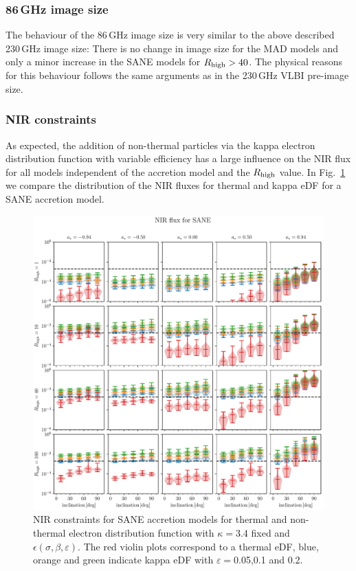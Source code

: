 \subsubsection{86\,GHz image size}
The behaviour of the 86\,GHz image size is very similar to the above described 230\,GHz image size: There is no change in image size for the MAD models and only a minor increase in the SANE models for $R_{\rm high}>40$. The physical reasons for this behaviour follows the same arguments as in the 230\,GHz VLBI pre-image size.

\subsubsection{NIR constraints}
As expected, the addition of non-thermal particles via the kappa electron distribution function with variable efficiency has a large influence on the NIR flux for all models independent of the accretion model and the $R_{\rm high}$ value. In Fig.~\ref{fig:NIR_kappaepsilon} we compare the distribution of the NIR fluxes for thermal and kappa eDF for a SANE accretion model.


\begin{figure}
  \centering
  \includegraphics[width=\columnwidth]{./figures/SANE_NIR_standard.pdf}
  \caption{NIR constraints for SANE accretion models for thermal and non-thermal electron distribution function with $\kappa=3.4$ fixed and $\epsilon\left(\sigma,\beta,\varepsilon\right)$. The red violin plots correspond to a thermal eDF, blue, orange and green indicate kappa eDF with $\varepsilon=$0.05,0.1 and 0.2.}
  \label{fig:NIR_kappaepsilon}
\end{figure}

